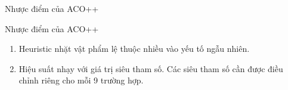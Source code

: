 \documentclass[aspectratio=169]{beamer}
\begin{document}
\begin{frame}{Nhược điểm của ACO++}
    \begin{block}{Nhược điểm của ACO++}
        \begin{enumerate}
            \vspace{0.1cm}
            \item Heuristic nhặt vật phẩm lệ thuộc nhiều vào yếu tố ngẫu nhiên.
            \vspace{0.1cm}
            \item Hiệu suất nhạy với giá trị siêu tham số. Các siêu tham số cần được điều chỉnh riêng cho mỗi 9 trường hợp.
            \vspace{0.1cm}
        \end{enumerate}
    \end{block}
\end{frame}
\end{document}
